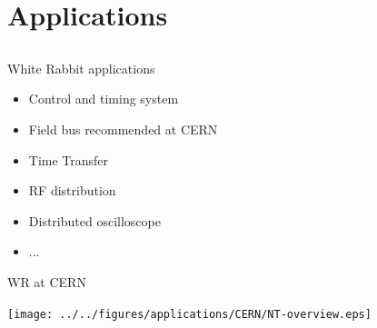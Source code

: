 \documentclass[compress,red]{beamer}
\begin{document}
\section{Applications}
\subsection{}
\begin{frame}{White Rabbit applications}

  \begin{itemize}
    \item Control and timing system
    \item Field bus recommended at CERN
    \item Time Transfer
    \item RF distribution
    \item Distributed oscilloscope
    \item ...
  \end{itemize}

\end{frame}
\begin{frame}{WR at CERN}

    \begin{center}
      \texttt{[image: ../../figures/applications/CERN/NT-overview.eps]}
    \end{center}

\end{frame}
\end{document}
